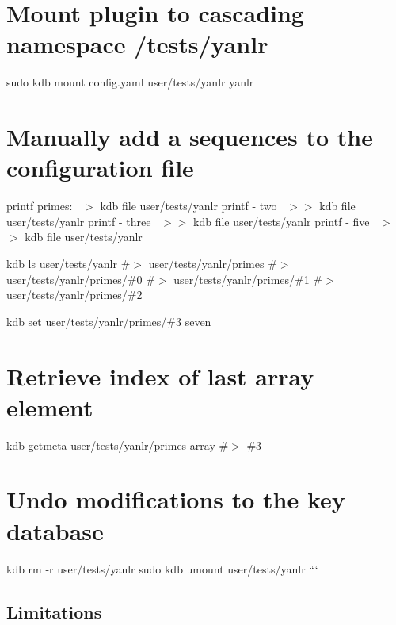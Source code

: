  \section*{Mount plugin to cascading namespace {\ttfamily /tests/yanlr}}

sudo kdb mount config.\+yaml user/tests/yanlr yanlr

\section*{Manually add a sequences to the configuration file}

printf \textquotesingle{}primes\+:~\newline
\textquotesingle{} $>$ {\ttfamily kdb file user/tests/yanlr} printf \textquotesingle{} -\/ two~\newline
\textquotesingle{} $>$$>$ {\ttfamily kdb file user/tests/yanlr} printf \textquotesingle{} -\/ three~\newline
\textquotesingle{} $>$$>$ {\ttfamily kdb file user/tests/yanlr} printf \textquotesingle{} -\/ five~\newline
\textquotesingle{} $>$$>$ {\ttfamily kdb file user/tests/yanlr}

kdb ls user/tests/yanlr \#$>$ user/tests/yanlr/primes \#$>$ user/tests/yanlr/primes/\#0 \#$>$ user/tests/yanlr/primes/\#1 \#$>$ user/tests/yanlr/primes/\#2

kdb set user/tests/yanlr/primes/\#3 seven

\section*{Retrieve index of last array element}

kdb getmeta user/tests/yanlr/primes array \#$>$ \#3

\section*{Undo modifications to the key database}

kdb rm -\/r user/tests/yanlr sudo kdb umount user/tests/yanlr ```

\subsection*{Limitations}


